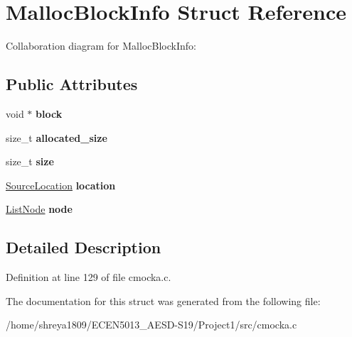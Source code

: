 \hypertarget{structMallocBlockInfo}{}\section{Malloc\+Block\+Info Struct Reference}
\label{structMallocBlockInfo}


Collaboration diagram for Malloc\+Block\+Info\+:
\subsection*{Public Attributes}
\begin{DoxyCompactItemize}
\item 
\mbox{\label{structMallocBlockInfo_aaca8b34ff6f79f4454bba197a21a52e7}} 
void $\ast$ {\bfseries block}
\item 
\mbox{\label{structMallocBlockInfo_a103783e0ba99bc5360f69c3b30a39048}} 
size\+\_\+t {\bfseries allocated\+\_\+size}
\item 
\mbox{\label{structMallocBlockInfo_a7d069f95b78b4e068752abc6277b786b}} 
size\+\_\+t {\bfseries size}
\item 
\mbox{\label{structMallocBlockInfo_af1a66bb07ef7e53441b7fca1c6c61906}} 
\hyperlink{structSourceLocation}{Source\+Location} {\bfseries location}
\item 
\mbox{\label{structMallocBlockInfo_ae4628c67b78874f1569ec84bf8978b91}} 
\hyperlink{structListNode}{List\+Node} {\bfseries node}
\end{DoxyCompactItemize}


\subsection{Detailed Description}


Definition at line 129 of file cmocka.\+c.



The documentation for this struct was generated from the following file\+:\begin{DoxyCompactItemize}
\item 
/home/shreya1809/\+E\+C\+E\+N5013\+\_\+\+A\+E\+S\+D-\/\+S19/\+Project1/src/cmocka.\+c\end{DoxyCompactItemize}
